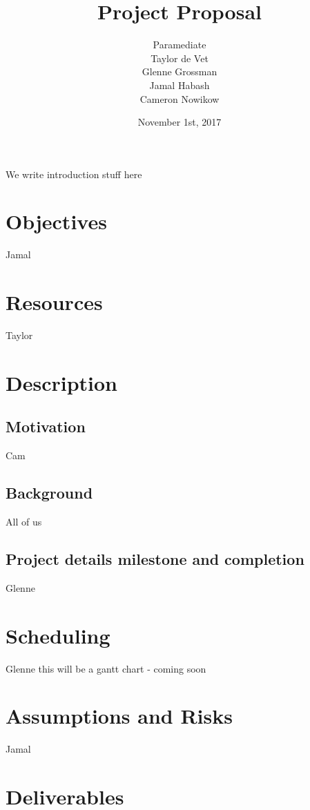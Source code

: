 \documentclass{article}
\title{Project Proposal}
\author{Paramediate
		\\ Taylor de Vet
    \\ Glenne Grossman
		\\ Jamal Habash
		\\ Cameron Nowikow
}
\date{November 1st, 2017}
\begin{document}
\newpage

\maketitle

We write introduction stuff here

\section{Objectives}
Jamal

\section{Resources}
Taylor


\section{Description}

\subsection{Motivation}
Cam
\subsection{Background}
All of us
\subsection{Project details milestone and completion}
Glenne
\section{Scheduling}
Glenne this will be a gantt chart - coming soon
\section{Assumptions and Risks}
Jamal
\section{Deliverables}
\end{document}
